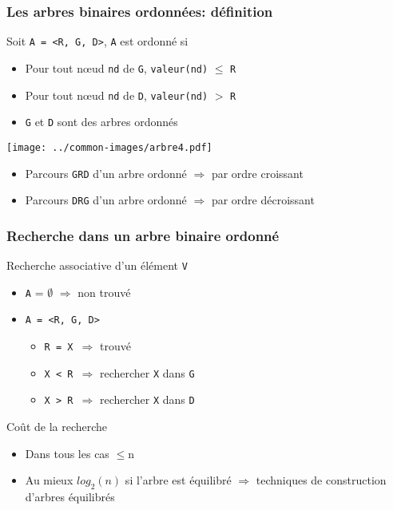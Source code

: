 \documentclass[table,handout,tikz,12pt,svgnames]{beamer}
\begin{document}
\begin{frame}[fragile=singleslide]
	\frametitle{Les arbres binaires ordonnées: définition}
	\begin{block}{Soit \texttt{A = <R, G, D>}, \texttt{A} est ordonné si}
		\begin{itemize}
			\item Pour tout nœud \texttt{nd} de \texttt{G}, \texttt{valeur(nd)} $\leq$ \texttt{R}
			\item Pour tout nœud \texttt{nd} de \texttt{D}, \texttt{valeur(nd)} $>$ \texttt{R}
			\item \texttt{G} et \texttt{D} sont des arbres ordonnés
		\end{itemize}
	\end{block}
	\begin{center}
		{\texttt{[image: ../common-images/arbre4.pdf]}}
	\end{center}
	\vspace{-1.1cm}
	\begin{block}{}
		\begin{itemize}
			\item Parcours \texttt{GRD} d'un arbre ordonné $\Rightarrow$ par ordre croissant
			\item Parcours \texttt{DRG} d'un arbre ordonné $\Rightarrow$ par ordre décroissant
		\end{itemize}
	\end{block}
\end{frame}


\begin{frame}[fragile=singleslide]
	\frametitle{Recherche dans un arbre binaire ordonné}
	\begin{block}{Recherche associative d'un élément \texttt{V}}
		\begin{itemize}
			\item \texttt{A} = $\emptyset$ $\Rightarrow$ non trouvé
			\item \texttt{A = <R, G, D>}
			\begin{itemize}
				\item \texttt{R = X $\Rightarrow$} trouvé
				\item \texttt{X < R $\Rightarrow$} rechercher \texttt{X} dans \texttt{G}
				\item \texttt{X > R $\Rightarrow$} rechercher \texttt{X} dans \texttt{D}	
			\end{itemize}
		\end{itemize}
	\end{block}
	\begin{block}{Coût de la recherche}
		\begin{itemize}
			\item Dans tous les cas $\leq$n
			\item Au mieux $log_2(n)$ si l'arbre est équilibré $\Rightarrow$ techniques de construction d'arbres équilibrés
		\end{itemize}
	\end{block}
\end{frame}
\end{document}

